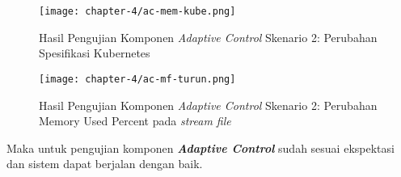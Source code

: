 \begin{figure}[h]
    \centering
    \texttt{[image: chapter-4/ac-mem-kube.png]}
    \caption{Hasil Pengujian Komponen \textit{Adaptive Control} Skenario 2: Perubahan Spesifikasi Kubernetes}
    \label{fig:ac-mem-kube}
\end{figure}

\begin{figure}[h]
    \centering
    \texttt{[image: chapter-4/ac-mf-turun.png]}
    \caption{Hasil Pengujian Komponen \textit{Adaptive Control} Skenario 2: Perubahan Memory Used Percent pada \textit{stream file}}
    \label{fig:ac-mf-turun}
\end{figure}

Maka untuk pengujian komponen \textbf{\textit{Adaptive Control}} sudah sesuai ekspektasi dan sistem dapat berjalan dengan baik.